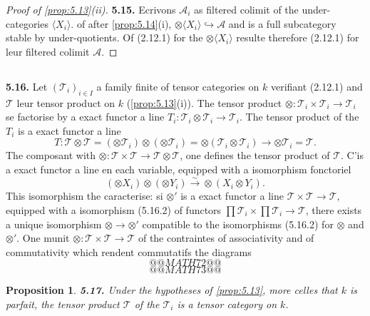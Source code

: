 \documentclass[12pt,a4paper]{article}
\theoremstyle{plain}
\newtheorem{proposition}[theorem]{Proposition}
\theoremstyle{definition}
\theoremstyle{remark}
\begin{document}
\begin{proof}[Proof of \ref{prop:5.13}(ii)]
\textbf{5.15.} Ecrivons $\mathcal{A}_i$ as filtered colimit of the under-categories $\langle X_i \rangle$. of after \ref{prop:5.14}(i), $\otimes \langle X_i \rangle \hookrightarrow \mathcal{A}$ and is a full subcategory stable by under-quotients. Of (2.12.1) for the $\otimes \langle X_i \rangle$ resulte therefore (2.12.1) for leur filtered colimit $\mathcal{A}$.
\end{proof}

\subsection{}

\textbf{5.16.} Let $(\mathcal{T}_i)_{i \in I}$ a family finite of tensor categories on $k$ verifiant (2.12.1) and $\mathcal{T}$ leur tensor product on $k$ (\ref{prop:5.13}(i)). The tensor product $\otimes : \mathcal{T}_i \times \mathcal{T}_i \to \mathcal{T}_i$ se factorise by a exact functor a line $T_i : \mathcal{T}_i \otimes \mathcal{T}_i \to \mathcal{T}_i$. The tensor product of the $T_i$ is a exact functor a line
\begin{equation}\label{eq:5.16.1}
T : \mathcal{T} \otimes \mathcal{T} = (\otimes \mathcal{T}_i) \otimes (\otimes \mathcal{T}_i) = \otimes (\mathcal{T}_i \otimes \mathcal{T}_i) \to \otimes \mathcal{T}_i = \mathcal{T}.
\end{equation}
The composant with $\otimes : \mathcal{T} \times \mathcal{T} \to \mathcal{T} \otimes \mathcal{T}$, one defines the tensor product of $\mathcal{T}$. C'is a exact functor a line en each variable, equipped with a isomorphism fonctoriel
\begin{equation}\label{eq:5.16.2}
(\otimes X_i) \otimes (\otimes Y_i) \xrightarrow{\sim} \otimes (X_i \otimes Y_i).
\end{equation}
This isomorphism the caracterise: si $\otimes'$ is a exact functor a line $\mathcal{T} \times \mathcal{T} \to \mathcal{T}$, equipped with a isomorphism (5.16.2) of functors $\prod \mathcal{T}_i \times \prod \mathcal{T}_i \to \mathcal{T}$, there exists a unique isomorphism $\otimes \to \otimes'$ compatible to the isomorphisms (5.16.2) for $\otimes$ and $\otimes'$. One munit $\otimes : \mathcal{T} \times \mathcal{T} \to \mathcal{T}$ of the contraintes of associativity and of commutativity which rendent commutatifs the diagrams
\[
@@MATH72@@
\]
\[
@@MATH73@@
\]

\begin{proposition}\label{prop:5.17}
\textbf{5.17.} Under the hypotheses of \ref{prop:5.13}, more celles that $k$ is parfait, the tensor product $\mathcal{T}$ of the $\mathcal{T}_i$ is a tensor category on $k$.
\end{proposition}
\end{document}

